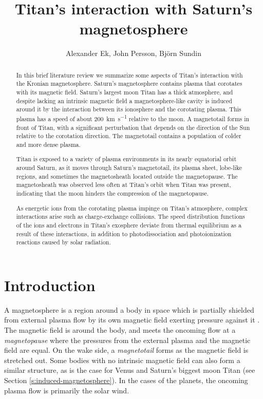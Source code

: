 \documentclass[12pt, parskip=full*, abstract]{scrartcl}
\title{Titan's interaction with Saturn's magnetosphere}
\author{Alexander Ek, John Persson, Björn Sundin}
\begin{document}
\maketitle
\vspace{5mm}
\begin{abstract}
	In this brief literature review we summarize some aspects of Titan's interaction with the Kronian magnetosphere. Saturn's magnetosphere contains plasma that corotates with its magnetic field. Saturn's largest moon Titan has a thick atmosphere, and despite lacking an intrinsic magnetic field a magnetosphere-like cavity is induced around it by the interaction between its ionosphere and the corotating plasma. This plasma has a speed of about \SI{200}{\kilo\metre\per\second} relative to the moon. A magnetotail forms in front of Titan, with a significant perturbation that depends on the direction of the Sun relative to the corotation direction. The magnetotail contains a population of colder and more dense plasma.
	
	Titan is exposed to a variety of plasma environments in its nearly equatorial orbit around Saturn, as it moves through Saturn's magnetotail, its plasma sheet, lobe-like regions, and sometimes the magnetosheath located outside the magnetopause. The magnetosheath was observed less often at Titan's orbit when Titan was present, indicating that the moon hinders the compression of the magnetopause.
	
	As energetic ions from the corotating plasma impinge on Titan's atmosphere, complex interactions arise such as charge-exchange collisions. The speed distribution functions of the ions and electrons in Titan's exosphere deviate from thermal equilibrium as a result of these interactions, in addition to photodissociation and photoionization reactions caused by solar radiation.
\end{abstract}

\newpage
\tableofcontents
\newpage

\section{Introduction}

A magnetosphere is a region around a body in space which is partially shielded from external plasma flow by its own magnetic field exerting pressure against it \parencite{encyclopedia-magnetospheres}. The magnetic field is  around the body, and meets the oncoming flow at a \textit{magnetopause} where the pressures from the external plasma and the magnetic field are equal. On the wake side, a \textit{magnetotail} forms as the magnetic field is stretched out. Some bodies with no intrinsic magnetic field can also form a similar structure, as is the case for Venus and Saturn's biggest moon Titan (see Section \ref{s:induced-magnetosphere}). In the cases of the planets, the oncoming plasma flow is primarily the solar wind. 
\end{document}
